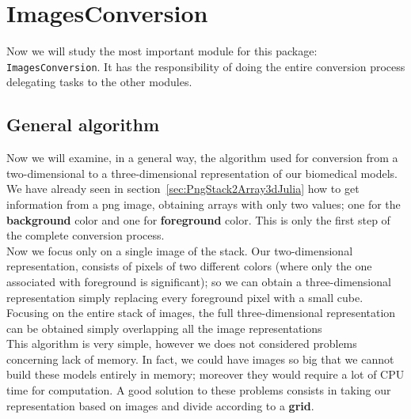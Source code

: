 \documentclass[11pt,oneside]{article}	%
\begin{document}
\section{ImagesConversion}\label{sec:ImagesConversion}
Now we will study the most important module for this package: \texttt{ImagesConversion}. It has the responsibility of doing the entire conversion process delegating tasks to the other modules.

\subsection{General algorithm}\label{sec:generalAlgorithm}

Now we will examine, in a general way, the algorithm used for conversion from a two-dimensional to a three-dimensional representation of our biomedical models.\\
We have already seen in section~\ref{sec:PngStack2Array3dJulia} how to get information from a png image, obtaining arrays with only two values; one for the \textbf{background} color and one for \textbf{foreground} color. This is only the first step of the complete conversion process.\\

Now we focus only on a single image of the stack. Our two-dimensional representation, consists of pixels of two different colors (where only the one associated with foreground is significant); so we can obtain a three-dimensional representation simply replacing every foreground pixel with a small cube. Focusing on the entire stack of images, the full three-dimensional representation can be obtained simply overlapping all the image representations\\

This algorithm is very simple, however we does not considered problems concerning lack of memory. In fact, we could have images so big that we cannot build these models entirely in memory; moreover they would require a lot of CPU time for computation. A good solution to these problems consists in taking our representation based on images and divide according to a \textbf{grid}.\\
\end{document}
